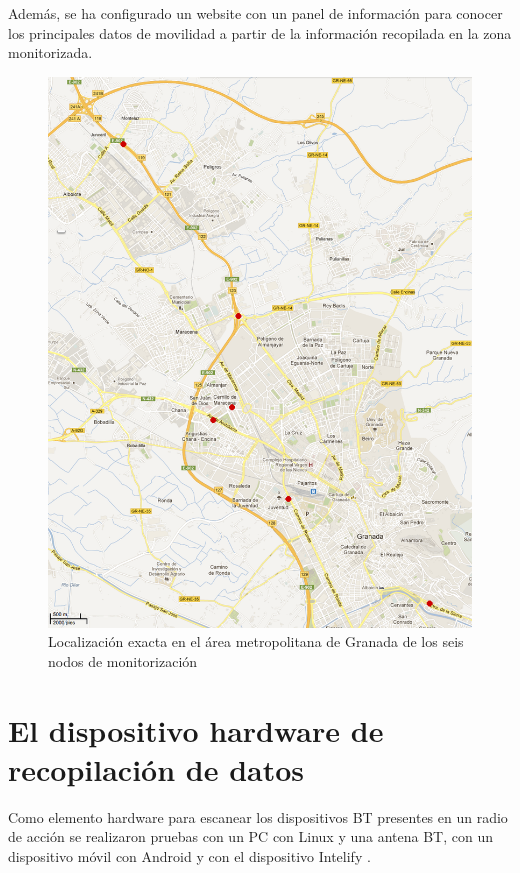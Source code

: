 \documentclass[twocolumn,twoside]{Jornadas}
\begin{document}
Además, se ha configurado un website con un panel de información para conocer los principales datos de movilidad a partir de la información recopilada en la zona monitorizada.


\begin{figure}[htpb] 
\begin{center} 
\includegraphics[scale=0.40]{mapa.png}
\end{center} 
\caption{Localización exacta en el área metropolitana de Granada de los seis nodos de monitorización} 
\label{mapa} 
\end{figure}




\section{El dispositivo hardware de recopilación de datos}
\label{hw}

Como elemento hardware para escanear los dispositivos BT presentes en un radio de acción se realizaron pruebas con un PC con Linux y una antena BT, con un dispositivo móvil con Android y con el dispositivo Intelify \cite{intelify}.
\end{document}
